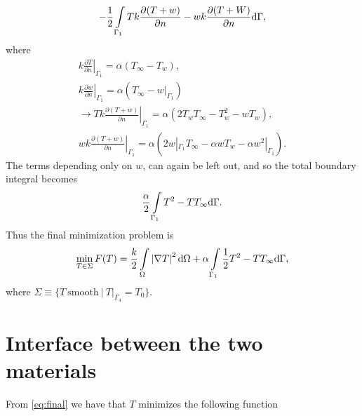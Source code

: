 \begin{gather*}
    -\frac{1}{2}\int\displaylimits_{\Gamma_1} T k \frac{\partial(T+w)}{\partial n} - wk\frac{\partial(T+W)}{\partial n}\mathrm{d}\Gamma,
\end{gather*} where
\begin{gather*}
    k\left.\frac{\partial T}{\partial n}\right|_{\Gamma_1} = \alpha (T_{\infty} - T_w),\\
    k\left.\frac{\partial w}{\partial n}\right|_{\Gamma_1} = \alpha (T_{\infty} - w|_{\Gamma_1})\\
    \rightarrow Tk \left.\frac{\partial(T+w)}{\partial n}\right|_{\Gamma_1} = \alpha\left( 2T_w T_{\infty} - T_w^2 - wT_w \right), \\
    wk \left.\frac{\partial(T+w)}{\partial n}\right|_{\Gamma_1}
    = \alpha\left( 2w|_{\Gamma_1} T_{\infty} - \alpha w T_w - \alpha w^2|_{\Gamma_1} \right).
\end{gather*} The terms depending only on $w$, can again be left out, and so the total boundary integral becomes
\begin{gather*}
    \frac{\alpha}{2}\int\displaylimits_{\Gamma_1} T^2 - TT_{\infty} \mathrm{d}\Gamma. 
\end{gather*} Thus the final minimization problem is
\begin{gather}
    \min_{T\in\Sigma} F(T)=\frac{k}{2}\int\displaylimits_{\Omega} \left|\nabla T\right|^2 \mathrm{d}\Omega + \alpha \int\displaylimits_{\Gamma_1} \frac{1}{2}T^2 - TT_{\infty} \mathrm{d}\Gamma,
\label{eq:final}
\end{gather} where $\Sigma \equiv \{ T~\text{smooth}~|~T|_{\Gamma_4}=T_0 \}$.

\section{Interface between the two materials} 

From \ref{eq:final} we have that $T$ minimizes the following function

